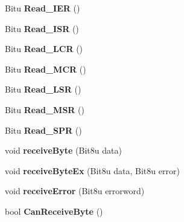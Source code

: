 \begin{DoxyCompactItemize}
\item 
\hypertarget{classCSerial_a35867fc7d933b6dfe45c566d6fea5619}{Bitu {\bfseries Read\-\_\-\-I\-E\-R} ()}\label{classCSerial_a35867fc7d933b6dfe45c566d6fea5619}

\item 
\hypertarget{classCSerial_a9ca17032de727b3288f09169bcdeee2f}{Bitu {\bfseries Read\-\_\-\-I\-S\-R} ()}\label{classCSerial_a9ca17032de727b3288f09169bcdeee2f}

\item 
\hypertarget{classCSerial_a9230f233f929e4f5b3154e662e3cb036}{Bitu {\bfseries Read\-\_\-\-L\-C\-R} ()}\label{classCSerial_a9230f233f929e4f5b3154e662e3cb036}

\item 
\hypertarget{classCSerial_aae3106549bad8f18adf37f1bacedbeff}{Bitu {\bfseries Read\-\_\-\-M\-C\-R} ()}\label{classCSerial_aae3106549bad8f18adf37f1bacedbeff}

\item 
\hypertarget{classCSerial_a2e52058acec7f6c4b85d6f0430abdae0}{Bitu {\bfseries Read\-\_\-\-L\-S\-R} ()}\label{classCSerial_a2e52058acec7f6c4b85d6f0430abdae0}

\item 
\hypertarget{classCSerial_a0e6ef678c9c62a8eb4ba407ad57a2d44}{Bitu {\bfseries Read\-\_\-\-M\-S\-R} ()}\label{classCSerial_a0e6ef678c9c62a8eb4ba407ad57a2d44}

\item 
\hypertarget{classCSerial_af1f36573bdc16f3510a75546f2d58a58}{Bitu {\bfseries Read\-\_\-\-S\-P\-R} ()}\label{classCSerial_af1f36573bdc16f3510a75546f2d58a58}

\item 
\hypertarget{classCSerial_a5a1977acc7ff580f49ac990783ed96b6}{void {\bfseries receive\-Byte} (Bit8u data)}\label{classCSerial_a5a1977acc7ff580f49ac990783ed96b6}

\item 
\hypertarget{classCSerial_afc7997bc5defdcb8c6c0a9ec094bf134}{void {\bfseries receive\-Byte\-Ex} (Bit8u data, Bit8u error)}\label{classCSerial_afc7997bc5defdcb8c6c0a9ec094bf134}

\item 
\hypertarget{classCSerial_a8c25f1946470adb7ab00b2abeee3008f}{void {\bfseries receive\-Error} (Bit8u errorword)}\label{classCSerial_a8c25f1946470adb7ab00b2abeee3008f}

\item 
\hypertarget{classCSerial_a6005dc8c0bc391f28f32b73600da9877}{bool {\bfseries Can\-Receive\-Byte} ()}\label{classCSerial_a6005dc8c0bc391f28f32b73600da9877}


\end{DoxyCompactItemize}
